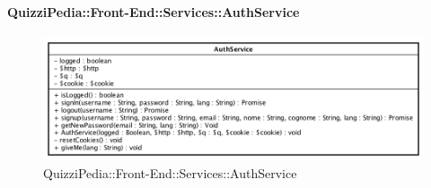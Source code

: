 \paragraph{QuizziPedia::Front-End::Services::AuthService}

\label{QuizziPedia::Front-End::Services::AuthService}
\begin{figure}[ht]
	\centering
	\includegraphics[scale=0.60]{UML/Classi/Front-End/QuizziPedia_Front-end_Services_AuthService.png}
	\caption{QuizziPedia::Front-End::Services::AuthService}
\end{figure} \FloatBarrier
